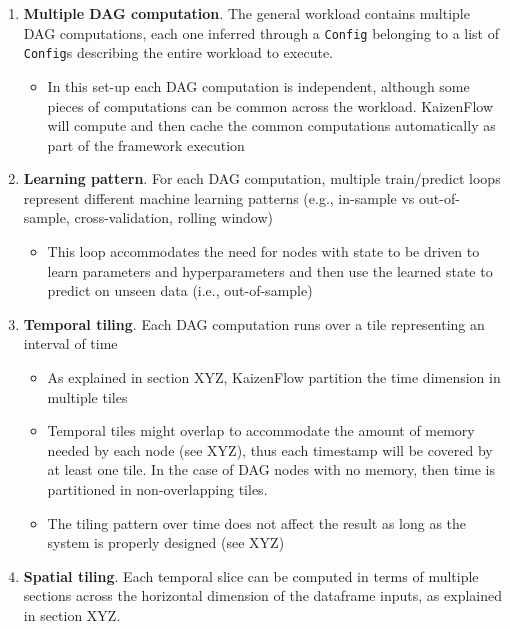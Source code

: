 \documentclass[11pt, reqno]{amsart}
\theoremstyle{definition}
\theoremstyle{remark}
\begin{document}
  \begin{enumerate}
    \item \textbf{Multiple DAG computation}. The general workload contains multiple
      DAG computations, each one inferred through a \verb|Config| belonging to a
      list of \verb|Config|s describing the entire workload to execute.
      \begin{itemize}
        \item In this set-up each DAG computation is independent, although some
          pieces of computations can be common across the workload. KaizenFlow will
          compute and then cache the common computations automatically as part of
          the framework execution
      \end{itemize}

    \item \textbf{Learning pattern}. For each DAG computation, multiple train/predict
      loops represent different machine learning patterns (e.g., in-sample vs out-of-sample,
      cross-validation, rolling window)
      \begin{itemize}
        \item This loop accommodates the need for nodes with state to be driven to
          learn parameters and hyperparameters and then use the learned state to
          predict on unseen data (i.e., out-of-sample)
      \end{itemize}

    \item \textbf{Temporal tiling}. Each DAG computation runs over a tile representing
      an interval of time
      \begin{itemize}
        \item As explained in section XYZ, KaizenFlow partition the time
          dimension in multiple tiles

        \item Temporal tiles might overlap to accommodate the amount of memory needed
          by each node (see XYZ), thus each timestamp will be covered by at
          least one tile. In the case of DAG nodes with no memory, then time is
          partitioned in non-overlapping tiles.

        \item The tiling pattern over time does not affect the result as long as
          the system is properly designed (see XYZ)
      \end{itemize}

    \item \textbf{Spatial tiling}. Each temporal slice can be computed in terms of
      multiple sections across the horizontal dimension of the dataframe inputs,
      as explained in section XYZ.


\end{enumerate}
\end{document}
